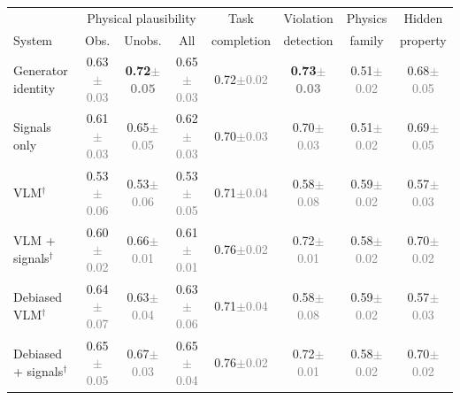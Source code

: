 \begin{table}[t]
    \centering
    \footnotesize
    \setlength{\tabcolsep}{2.6pt}
    \begin{tabular}{@{}lccccccc@{}}
        \toprule
        & \multicolumn{3}{c}{Physical plausibility} & Task & Violation & Physics & Hidden \\
        \cmidrule(lr){2-4}
        System & Obs. & Unobs. & All & completion & detection & family & property \\
        \midrule
        Generator identity & 0.63{\scriptsize\textcolor{gray}{$\pm$0.03}} & \textbf{0.72{\scriptsize\textcolor{gray}{$\pm$0.05}}} & 0.65{\scriptsize\textcolor{gray}{$\pm$0.03}} & 0.72{\scriptsize\textcolor{gray}{$\pm$0.02}} & \textbf{0.73{\scriptsize\textcolor{gray}{$\pm$0.03}}} & 0.51{\scriptsize\textcolor{gray}{$\pm$0.02}} & 0.68{\scriptsize\textcolor{gray}{$\pm$0.05}} \\
        Signals only & 0.61{\scriptsize\textcolor{gray}{$\pm$0.03}} & 0.65{\scriptsize\textcolor{gray}{$\pm$0.05}} & 0.62{\scriptsize\textcolor{gray}{$\pm$0.03}} & 0.70{\scriptsize\textcolor{gray}{$\pm$0.03}} & 0.70{\scriptsize\textcolor{gray}{$\pm$0.03}} & 0.51{\scriptsize\textcolor{gray}{$\pm$0.02}} & 0.69{\scriptsize\textcolor{gray}{$\pm$0.05}} \\
        \midrule
        VLM$^\dagger$ & 0.53{\scriptsize\textcolor{gray}{$\pm$0.06}} & 0.53{\scriptsize\textcolor{gray}{$\pm$0.06}} & 0.53{\scriptsize\textcolor{gray}{$\pm$0.05}} & 0.71{\scriptsize\textcolor{gray}{$\pm$0.04}} & 0.58{\scriptsize\textcolor{gray}{$\pm$0.08}} & 0.59{\scriptsize\textcolor{gray}{$\pm$0.02}} & 0.57{\scriptsize\textcolor{gray}{$\pm$0.03}} \\
        VLM + signals$^\dagger$ & 0.60{\scriptsize\textcolor{gray}{$\pm$0.02}} & 0.66{\scriptsize\textcolor{gray}{$\pm$0.01}} & 0.61{\scriptsize\textcolor{gray}{$\pm$0.01}} & 0.76{\scriptsize\textcolor{gray}{$\pm$0.02}} & 0.72{\scriptsize\textcolor{gray}{$\pm$0.01}} & 0.58{\scriptsize\textcolor{gray}{$\pm$0.02}} & 0.70{\scriptsize\textcolor{gray}{$\pm$0.02}} \\
        Debiased VLM$^\dagger$ & 0.64{\scriptsize\textcolor{gray}{$\pm$0.07}} & 0.63{\scriptsize\textcolor{gray}{$\pm$0.04}} & 0.63{\scriptsize\textcolor{gray}{$\pm$0.06}} & 0.71{\scriptsize\textcolor{gray}{$\pm$0.04}} & 0.58{\scriptsize\textcolor{gray}{$\pm$0.08}} & 0.59{\scriptsize\textcolor{gray}{$\pm$0.02}} & 0.57{\scriptsize\textcolor{gray}{$\pm$0.03}} \\
        Debiased + signals$^\dagger$ & 0.65{\scriptsize\textcolor{gray}{$\pm$0.05}} & 0.67{\scriptsize\textcolor{gray}{$\pm$0.03}} & 0.65{\scriptsize\textcolor{gray}{$\pm$0.04}} & 0.76{\scriptsize\textcolor{gray}{$\pm$0.02}} & 0.72{\scriptsize\textcolor{gray}{$\pm$0.01}} & 0.58{\scriptsize\textcolor{gray}{$\pm$0.02}} & 0.70{\scriptsize\textcolor{gray}{$\pm$0.02}} \\

\end{tabular}
\end{table}
